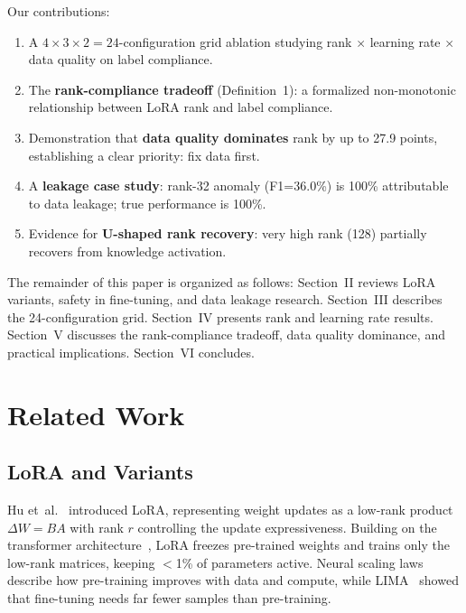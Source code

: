 \documentclass[journal]{IEEEtran}
\begin{document}
Our contributions:
\begin{enumerate}
\item A $4 \times 3 \times 2 = 24$-configuration grid ablation studying rank $\times$ learning rate $\times$ data quality on label compliance.
\item The \textbf{rank-compliance tradeoff} (Definition~1): a formalized non-monotonic relationship between LoRA rank and label compliance.
\item Demonstration that \textbf{data quality dominates} rank by up to 27.9 points, establishing a clear priority: fix data first.
\item A \textbf{leakage case study}: rank-32 anomaly (F1=36.0\%) is 100\% attributable to data leakage; true performance is 100\%.
\item Evidence for \textbf{U-shaped rank recovery}: very high rank (128) partially recovers from knowledge activation.
\end{enumerate}

The remainder of this paper is organized as follows: Section~II reviews LoRA variants, safety in fine-tuning, and data leakage research. Section~III describes the 24-configuration grid. Section~IV presents rank and learning rate results. Section~V discusses the rank-compliance tradeoff, data quality dominance, and practical implications. Section~VI concludes.

\section{Related Work}

\subsection{LoRA and Variants}
Hu et~al.~\cite{hu2022} introduced LoRA, representing weight updates as a low-rank product $\Delta W = BA$ with rank $r$ controlling the update expressiveness. Building on the transformer architecture~\cite{vaswani2017}, LoRA freezes pre-trained weights and trains only the low-rank matrices, keeping $<$1\% of parameters active. Neural scaling laws~\cite{kaplan2020} describe how pre-training improves with data and compute, while LIMA~\cite{zhou2023} showed that fine-tuning needs far fewer samples than pre-training.
\end{document}
